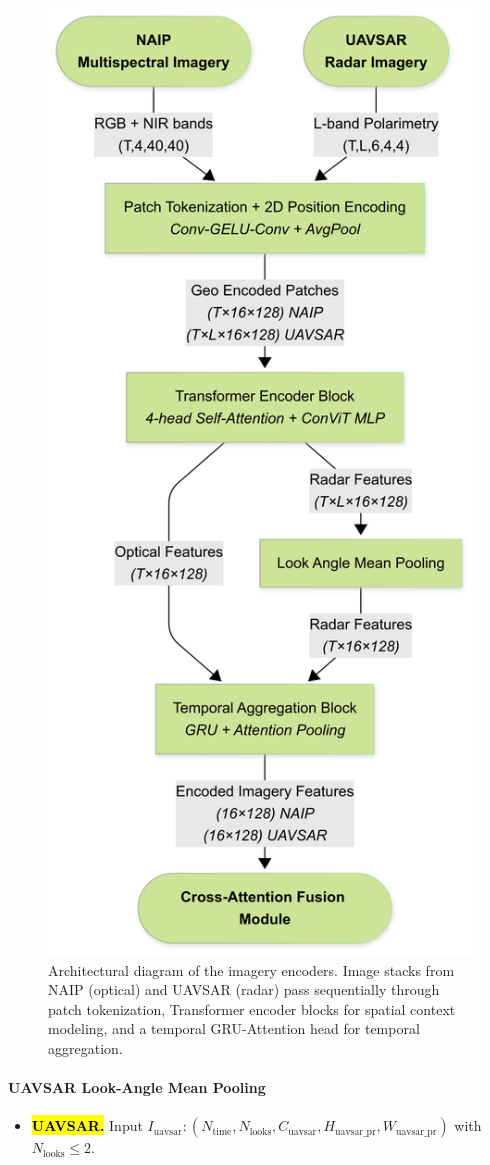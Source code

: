 \documentclass[remotesensing,article,accept,pdftex,moreauthors]{Definitions/mdpi}
\begin{document}
\begin{figure}[H]

    \includegraphics[trim=0mm 0mm 20mm 0mm, clip, width=0.57\linewidth]{figures/Imagery_Encoders.png}
    \caption{Architectural diagram of the imagery encoders. Image stacks from NAIP (optical) and UAVSAR (radar) pass sequentially through patch tokenization, Transformer encoder blocks for spatial context modeling, and a temporal GRU-Attention head for temporal aggregation.}
    \label{fig:imgenc}
\end{figure}





\paragraph{UAVSAR Look-Angle Mean Pooling}
\begin{itemize}[leftmargin=*]
\item \textbf{\hl{UAVSAR.}}  
      Input $I_{\text{uavsar}}: (N_{\text{time}}, N_{\text{looks}}, C_{\text{uavsar}}, H_{\text{uavsar\_pr}}, W_{\text{uavsar\_pr}})$ with \mbox{$N_{\text{looks}} \leq 2$}.  
\end{itemize}
\end{document}
